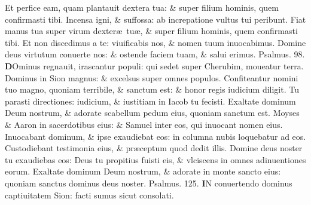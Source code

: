 \documentclass[a5paper,10pt]{book}
\def\ae{æ}
\begin{document}
\begin{multicols*}{2}
\newline \color{red} E\color{black}t perfice eam, quam plantauit dextera tua: \& super filium hominis, quem confirmasti tibi.
\newline \color{red} I\color{black}ncensa igni, \& suffossa: ab increpatione vultus tui peribunt.
\newline \color{red} F\color{black}iat manus tua super virum dexter\ae \ tu\ae , \& super filium hominis, quem confirmasti tibi.
\newline \color{red} E\color{black}t non discedimus a te: viuificabis nos, \& nomen tuum inuocabimus.
\newline \color{red} D\color{black}omine deus virtutum conuerte nos: \& ostende faciem tuam, \& salui erimus. \quad \color{red} Psalmus. 98. \color{black}
\vspace{-.5em}
\lettrine[lines=2]{\bfseries \color{red} D}{}Ominus regnauit, irascantur populi: qui sedet super Cherubim, moueatur terra.
\newline \color{red} D\color{black}ominus in Sion magnus: \& excelsus super omnes populos.
\newline \color{red} C\color{black}onfiteantur nomini tuo magno, quoniam terribile, \& sanctum est: \& honor regis iudicium diligit.
\newline \color{red} T\color{black}u parasti directiones: iudicium, \& iustitiam in Iacob tu fecisti.
\newline \color{red} E\color{black}xaltate dominum Deum nostrum, \& adorate scabellum pedum eius, quoniam sanctum est.
\newline \color{red} M\color{black}oyses \& Aaron in sacerdotibus eius: \& Samuel inter eos, qui inuocant nomen eius.
\newline \color{red} I\color{black}nuocabant dominum, \& ipse exaudiebat eos: in columna nubis loquebatur ad eos.
\newline \color{red} C\color{black}ustodiebant testimonia eius, \& pr\ae ceptum quod dedit illis.
\newline \color{red} D\color{black}omine deus noster tu exaudiebas eos: Deus tu propitius fuisti eis, \& vlciscens in omnes adinuentiones eorum.
\newline \color{red} E\color{black}xaltate dominum Deum nostrum, \& adorate in monte sancto eius: quoniam sanctus dominus deus noster. \quad \color{red} Psalmus. 125. \color{black}
\lettrine[lines=2]{\bfseries \color{red} I}{}N conuertendo dominus captiuitatem Sion: facti sumus sicut consolati.

\end{multicols*}
\end{document}
